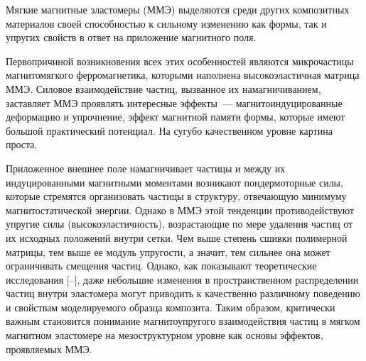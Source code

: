 


\renewcommand{\JournalDataOnline}{\displaydate{billerdo}}












\makerutitle






Мягкие магнитные эластомеры (ММЭ) выделяются среди других композитных материалов своей способностью к сильному изменению как формы, так и упругих свойств в ответ на приложение магнитного поля. 

Первопричиной возникновения всех этих особенностей являются микрочастицы магнитомягкого ферромагнетика, которыми наполнена высокоэластичная матрица ММЭ. Силовое взаимодействие частиц, вызванное их намагничиванием, заставляет ММЭ проявлять интересные эффекты~--- магнитоиндуцированные деформацию и упрочнение, эффект магнитной памяти формы, которые имеют большой практический потенциал. На сугубо качественном уровне картина проста. 

Приложенное внешнее поле намагничивает частицы и между их индуцированными магнитными моментами возникают пондермоторные силы, которые стремятся организовать частицы в структуру, отвечающую минимуму магнитостатической энергии. Однако в ММЭ этой тенденции противодействуют упругие силы (высокоэластичность), возрастающие по мере удаления частиц от их исходных положений внутри сетки. Чем выше степень сшивки полимерной матрицы, тем выше ее модуль упругости, а значит, тем сильнее она может ограничивать смещения частиц. Однако, как показывают теоретические исследования [--], даже небольшие изменения в пространственном распределении частиц внутри эластомера могут приводить к качественно различному поведению и свойствам моделируемого образца композита. Таким образом, критически важным становится понимание магнитоупругого взаимодействия частиц в мягком магнитном эластомере на мезоструктурном уровне как основы эффектов, проявляемых ММЭ.



